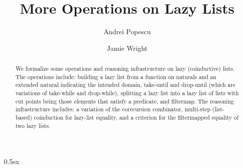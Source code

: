 \documentclass[11pt,a4paper]{article}
\begin{document}
\title{More Operations on Lazy Lists}
\author{Andrei Popescu \and Jamie Wright}
\maketitle

\begin{abstract}
	We formalize some operations and reasoning infrastructure on lazy (coinductive) lists.
	The operations include: building a lazy list from a function on naturals and an extended natural indicating the intended domain, take-until and drop-until (which are variations of take-while and drop-while), splitting a lazy list into a lazy list of lists with cut points being those elements that satisfy a predicate, and filtermap. 
	The reasoning infrastructure includes: a variation of the corecursion combinator, multi-step (list-based) coinduction for lazy-list equality, and a criterion  for the filtermapped equality of two lazy lists. 
\end{abstract}

\tableofcontents

\parindent 0pt\parskip 0.5ex



%
%
\end{document}
